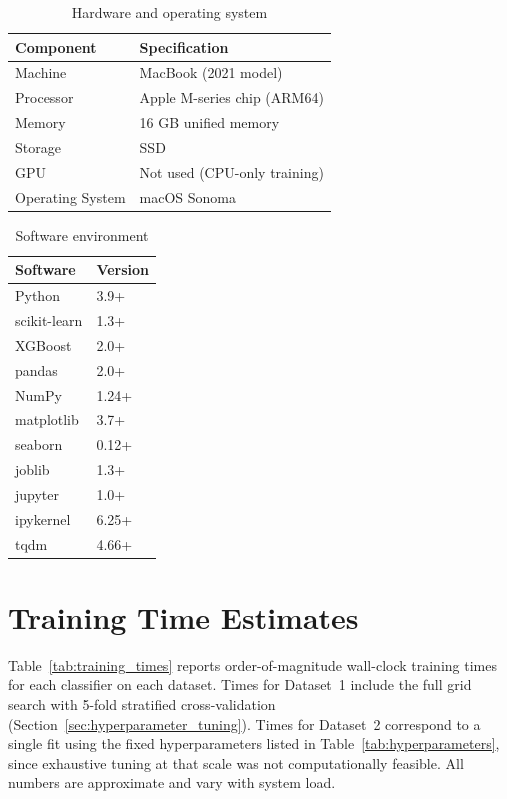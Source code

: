 \begin{table}[H]
\centering
\caption{Hardware and operating system}
\label{tab:hardware}
\begin{tabular}{@{}ll@{}}
\toprule
\textbf{Component} & \textbf{Specification} \\
\midrule
Machine          & MacBook (2021 model) \\
Processor        & Apple M-series chip (ARM64) \\
Memory           & 16 GB unified memory \\
Storage          & SSD \\
GPU              & Not used (CPU-only training) \\
Operating System & macOS Sonoma \\
\bottomrule
\end{tabular}
\end{table}

\begin{table}[H]
\centering
\caption{Software environment}
\label{tab:software}
\begin{tabular}{@{}ll@{}}
\toprule
\textbf{Software} & \textbf{Version} \\
\midrule
Python     & 3.9+ \\
scikit-learn & 1.3+ \\
XGBoost    & 2.0+ \\
pandas     & 2.0+ \\
NumPy      & 1.24+ \\
matplotlib & 3.7+ \\
seaborn    & 0.12+ \\
joblib     & 1.3+ \\
jupyter    & 1.0+ \\
ipykernel  & 6.25+ \\
tqdm       & 4.66+ \\
\bottomrule
\end{tabular}
\end{table}

\section{Training Time Estimates}
\label{app:training_times}

Table~\ref{tab:training_times} reports order-of-magnitude wall-clock training times for each classifier on each dataset. Times for Dataset~1 include the full grid search with 5-fold stratified cross-validation (Section~\ref{sec:hyperparameter_tuning}). Times for Dataset~2 correspond to a single fit using the fixed hyperparameters listed in Table~\ref{tab:hyperparameters}, since exhaustive tuning at that scale was not computationally feasible. All numbers are approximate and vary with system load.


